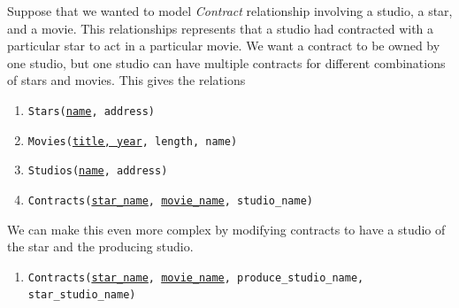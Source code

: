     \begin{example}
      \label{ex:movie-stars-2}
      Suppose that we wanted to model \textit{Contract} relationship involving a studio, a star, and a movie. This relationships represents that a studio had contracted with a particular star to act in a particular movie. We want a contract to be owned by one studio, but one studio can have multiple contracts for different combinations of stars and movies. This gives the relations 
      \begin{enumerate}
        \item \texttt{Stars(\underline{name}, address)} 
        \item \texttt{Movies(\underline{title, year}, length, name)} 
        \item \texttt{Studios(\underline{name}, address)} 
        \item \texttt{Contracts(\underline{star\_name}, \underline{movie\_name}, studio\_name)}
      \end{enumerate}

      \begin{figure}[H]
        \centering 
        \caption{} 
        \label{fig:movie-contracts-simple}
      \end{figure}

      We can make this even more complex by modifying contracts to have a studio of the star and the producing studio. 
      \begin{enumerate}
        \item \texttt{Contracts(\underline{star\_name}, \underline{movie\_name}, produce\_studio\_name, star\_studio\_name)}
      \end{enumerate}


\end{example}
